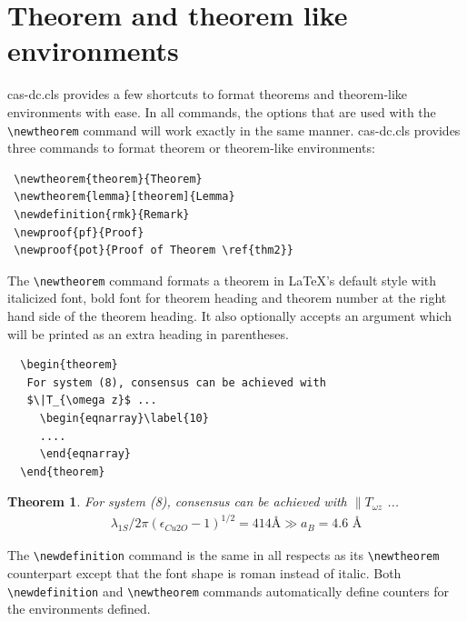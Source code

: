 \documentclass[a4paper,fleqn]{cas-dc}
\begin{document}
\section{Theorem and theorem like environments} %

{cas-dc.cls} provides a few shortcuts to format theorems and
theorem-like environments with ease. In all commands, the options that
are used with the \verb+\newtheorem+ command will work exactly in the same
manner. {cas-dc.cls} provides three commands to format theorem or
theorem-like environments: 

\begin{verbatim}
 \newtheorem{theorem}{Theorem}
 \newtheorem{lemma}[theorem]{Lemma}
 \newdefinition{rmk}{Remark}
 \newproof{pf}{Proof}
 \newproof{pot}{Proof of Theorem \ref{thm2}}
\end{verbatim}

The \verb+\newtheorem+ command formats a
theorem in \LaTeX's default style with italicized font, bold font
for theorem heading and theorem number at the right hand side of the
theorem heading. It also optionally accepts an argument which
will be printed as an extra heading in parentheses. 

\begin{verbatim}
  \begin{theorem} 
   For system (8), consensus can be achieved with 
   $\|T_{\omega z}$ ...
     \begin{eqnarray}\label{10}
     ....
     \end{eqnarray}
  \end{theorem}
\end{verbatim}  

\newtheorem{theorem}{Theorem}

\begin{theorem}
For system (8), consensus can be achieved with 
$\|T_{\omega z}$ ...
\begin{eqnarray}\label{10}
	\lambda_{1S}/2 \pi \left({\epsilon_{Cu2O}-1}\right)^{1/2} = 414 \mbox{
	\AA} \gg a_B = 4.6 \mbox{ \AA}  
\end{eqnarray}
\end{theorem}

The \verb+\newdefinition+ command is the same in
all respects as its \verb+\newtheorem+ counterpart except that
the font shape is roman instead of italic. Both
\verb+\newdefinition+ and \verb+\newtheorem+ commands
automatically define counters for the environments defined.
\end{document}
